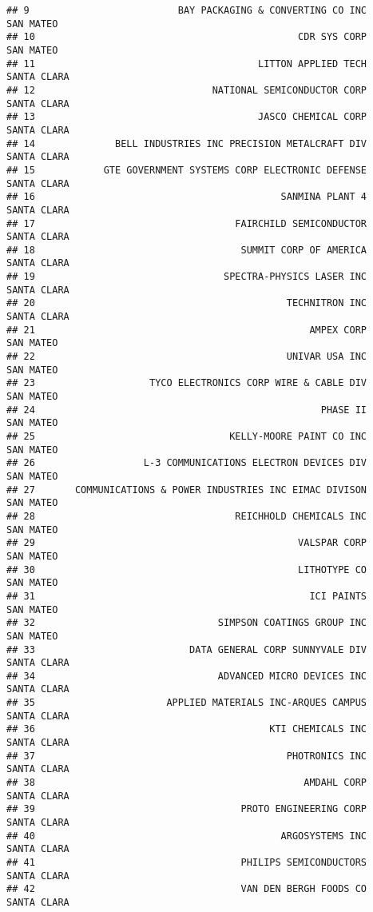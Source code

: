 \documentclass[
]{book}
\begin{document}
\begin{verbatim}
## 9                          BAY PACKAGING & CONVERTING CO INC     SAN MATEO
## 10                                              CDR SYS CORP     SAN MATEO
## 11                                       LITTON APPLIED TECH   SANTA CLARA
## 12                               NATIONAL SEMICONDUCTOR CORP   SANTA CLARA
## 13                                       JASCO CHEMICAL CORP   SANTA CLARA
## 14              BELL INDUSTRIES INC PRECISION METALCRAFT DIV   SANTA CLARA
## 15            GTE GOVERNMENT SYSTEMS CORP ELECTRONIC DEFENSE   SANTA CLARA
## 16                                           SANMINA PLANT 4   SANTA CLARA
## 17                                   FAIRCHILD SEMICONDUCTOR   SANTA CLARA
## 18                                    SUMMIT CORP OF AMERICA   SANTA CLARA
## 19                                 SPECTRA-PHYSICS LASER INC   SANTA CLARA
## 20                                            TECHNITRON INC   SANTA CLARA
## 21                                                AMPEX CORP     SAN MATEO
## 22                                            UNIVAR USA INC     SAN MATEO
## 23                    TYCO ELECTRONICS CORP WIRE & CABLE DIV     SAN MATEO
## 24                                                  PHASE II     SAN MATEO
## 25                                  KELLY-MOORE PAINT CO INC     SAN MATEO
## 26                   L-3 COMMUNICATIONS ELECTRON DEVICES DIV     SAN MATEO
## 27       COMMUNICATIONS & POWER INDUSTRIES INC EIMAC DIVISON     SAN MATEO
## 28                                   REICHHOLD CHEMICALS INC     SAN MATEO
## 29                                              VALSPAR CORP     SAN MATEO
## 30                                              LITHOTYPE CO     SAN MATEO
## 31                                                ICI PAINTS     SAN MATEO
## 32                                SIMPSON COATINGS GROUP INC     SAN MATEO
## 33                           DATA GENERAL CORP SUNNYVALE DIV   SANTA CLARA
## 34                                ADVANCED MICRO DEVICES INC   SANTA CLARA
## 35                       APPLIED MATERIALS INC-ARQUES CAMPUS   SANTA CLARA
## 36                                         KTI CHEMICALS INC   SANTA CLARA
## 37                                            PHOTRONICS INC   SANTA CLARA
## 38                                               AMDAHL CORP   SANTA CLARA
## 39                                    PROTO ENGINEERING CORP   SANTA CLARA
## 40                                           ARGOSYSTEMS INC   SANTA CLARA
## 41                                    PHILIPS SEMICONDUCTORS   SANTA CLARA
## 42                                    VAN DEN BERGH FOODS CO   SANTA CLARA

\end{verbatim}
\end{document}
